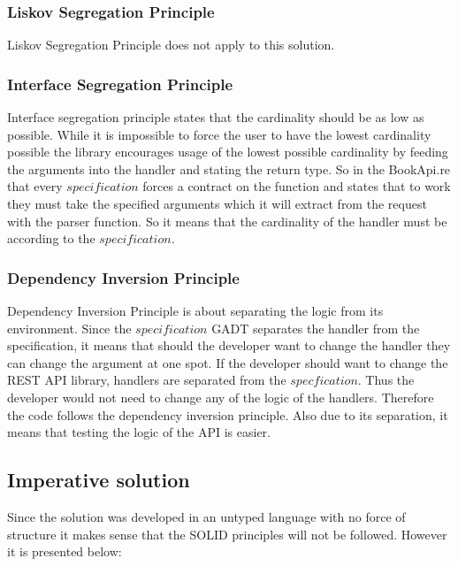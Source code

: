 \subsubsection{Liskov Segregation Principle}

Liskov Segregation Principle does not apply to this solution.

\subsubsection{Interface Segregation Principle}

Interface segregation principle states that the cardinality should be as low as
possible.  While it is impossible to force the user to have the lowest
cardinality possible the library encourages usage of the lowest possible
cardinality by feeding the arguments into the handler and stating the return
type. So in the BookApi.re that every $specification$ forces a contract on the
function and states that to work they must take the specified arguments which
it will extract from the request with the parser function. So it means that the
cardinality of the handler must be according to the $specification$.

\subsubsection{Dependency Inversion Principle}

Dependency Inversion Principle is about separating the logic from its
environment.  Since the $specification$ GADT separates the handler from the
specification, it means that should the developer want to change the handler
they can change the argument at one spot. If the developer should want to change
the REST API library, handlers are separated from the $specfication$. Thus the
developer would not need to change any of the logic of the handlers. Therefore
the code follows the dependency inversion principle.  Also due to its
separation, it means that testing the logic of the API is easier.  

\subsection{Imperative solution}

Since the solution was developed in an untyped language with no force of
structure it makes sense that the SOLID principles will not be followed. However
it is presented below:


